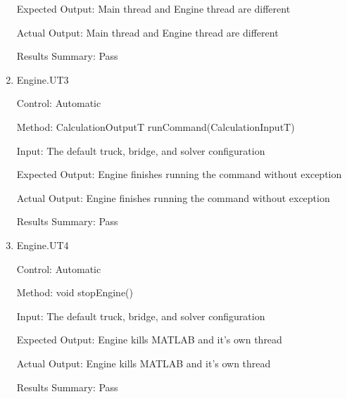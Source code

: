 \documentclass[12pt, titlepage]{article}
\begin{document}
\begin{enumerate}
  Expected Output: Main thread and Engine thread are different

  Actual Output: Main thread and Engine thread are different

  Results Summary: Pass

  \item {Engine.UT3}

  Control: Automatic

  Method: CalculationOutputT runCommand(CalculationInputT)

  Input: The default truck, bridge, and solver configuration

  Expected Output: Engine finishes running the command without exception

  Actual Output: Engine finishes running the command without exception

  Results Summary: Pass

  \item {Engine.UT4}

  Control: Automatic

  Method: void stopEngine()

  Input: The default truck, bridge, and solver configuration

  Expected Output: Engine kills MATLAB and it's own thread

  Actual Output: Engine kills MATLAB and it's own thread

  Results Summary: Pass

\end{enumerate}
\end{document}
